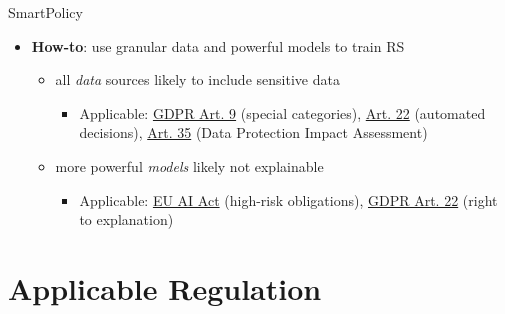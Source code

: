 \documentclass[
  ignorenonframetext,
]{beamer}
\providecommand{\tightlist}{%
  \setlength{\itemsep}{0pt}\setlength{\parskip}{0pt}}
\begin{document}
\begin{frame}{SmartPolicy}
\label{smartpolicy-1}
\begin{itemize}
\tightlist
\item
  \textbf{How-to}: use granular data and powerful models to train RS

  \begin{itemize}
  \tightlist
  \item
    all \emph{data} sources likely to include sensitive data

    \begin{itemize}
    \tightlist
    \item
      Applicable: \href{https://gdpr-info.eu/art-9-gdpr/}{GDPR Art. 9}
      (special categories),
      \href{https://gdpr-info.eu/art-22-gdpr/}{Art. 22} (automated
      decisions), \href{https://gdpr-info.eu/art-35-gdpr/}{Art. 35}
      (Data Protection Impact Assessment)
    \end{itemize}
  \item
    more powerful \emph{models} likely not explainable

    \begin{itemize}
    \tightlist
    \item
      Applicable:
      \href{https://eur-lex.europa.eu/legal-content/EN/TXT/?uri=CELEX:32024R1689}{EU
      AI Act} (high-risk obligations),
      \href{https://gdpr-info.eu/art-22-gdpr/}{GDPR Art. 22} (right to
      explanation)
    \end{itemize}
  \end{itemize}
\end{itemize}
\end{frame}

\section{Applicable Regulation}\label{applicable-regulation}
\end{document}
